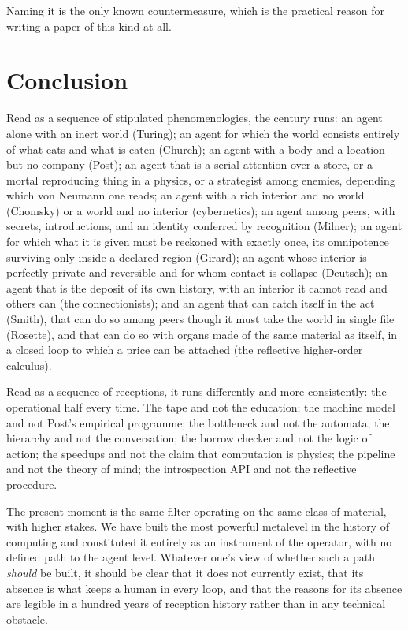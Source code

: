 \documentclass[11pt,a4paper]{article}
\begin{document}
Naming it is the only known countermeasure, which is the practical reason for
writing a paper of this kind at all.

\section{Conclusion}

Read as a sequence of stipulated phenomenologies, the century runs: an agent alone
with an inert world (Turing); an agent for which the world consists entirely of
what eats and what is eaten (Church); an agent with a body and a location but no
company (Post); an agent that is a serial attention over a store, or a mortal
reproducing thing in a physics, or a strategist among enemies, depending which von
Neumann one reads; an agent with a rich interior and no world (Chomsky) or a world
and no interior (cybernetics); an agent among peers, with secrets, introductions,
and an identity conferred by recognition (Milner); an agent for which what it is
given must be reckoned with exactly once, its omnipotence surviving only inside a
declared region (Girard); an agent whose interior is perfectly private and
reversible and for whom contact is collapse (Deutsch); an agent that is the
deposit of its own history, with an interior it cannot read and others can
(the connectionists); and an agent that can catch
itself in the act (Smith), that can do so among peers though it must take the
world in single file (Rosette), and that can do so with organs made of the same
material as itself, in a closed loop to which a price can be attached (the
reflective higher-order calculus).

Read as a sequence of receptions, it runs differently and more consistently: the
operational half every time. The tape and not the education; the machine model and
not Post's empirical programme; the bottleneck and not the automata; the hierarchy
and not the conversation; the borrow checker and not the logic of action; the
speedups and not the claim that computation is physics; the pipeline and not the
theory of mind; the introspection API and not the reflective procedure.

The present moment is the same filter operating on the same class of material,
with higher stakes. We have built the most powerful metalevel in the history of
computing and constituted it entirely as an instrument of the operator, with no
defined path to the agent level. Whatever one's view of whether such a path
\emph{should} be built, it should be clear that it does not currently exist, that
its absence is what keeps a human in every loop, and that the reasons for its
absence are legible in a hundred years of reception history rather than in any
technical obstacle.
\end{document}
